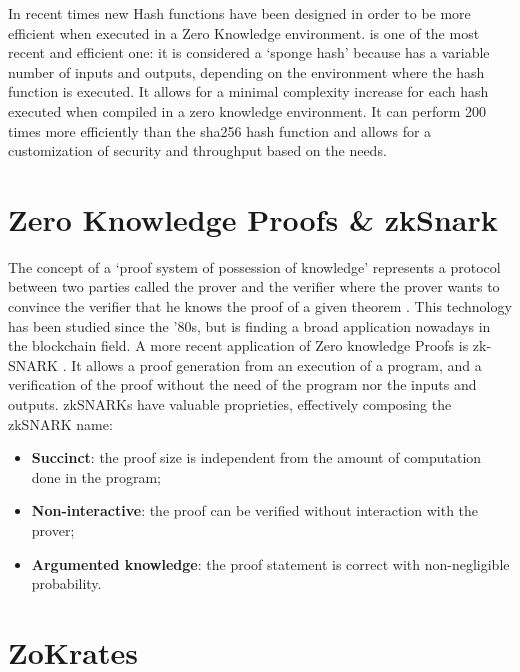 In recent times new Hash functions have been designed in order to be more efficient when executed in a Zero Knowledge environment. \cite{grassi_poseidon_2021} is one of the most recent and efficient one: it is considered a `sponge hash' because has a variable number of inputs and outputs, depending on the environment where the hash function is executed. It allows for a minimal complexity increase for each hash executed when compiled in a zero knowledge environment. It can perform 200 times more efficiently than the sha256 hash function and allows for a customization of security and throughput based on the needs.

\section{Zero Knowledge Proofs \& zkSnark}

The concept of a `proof system of possession of knowledge' represents a protocol between two parties called the prover and the verifier where the prover wants to convince the verifier that he knows the proof of a given theorem \cite{de_santis_zero-knowledge_1992}. This technology has been studied since the '80s, but is finding a broad application nowadays in the blockchain field. A more recent application of Zero knowledge Proofs is zk-SNARK \cite{bitansky_extractable_2012}. It allows a proof generation from an execution of a program, and a verification of the proof without the need of the program nor the inputs and outputs. zkSNARKs have valuable proprieties, effectively composing the zkSNARK name:
\begin{itemize}
      \item \textbf{Succinct}: the proof size is independent from the amount of computation done in the program;
            \vspace{-0.11in}
      \item \textbf{Non-interactive}: the proof can be verified without interaction with the prover;
            \vspace{-0.11in}
      \item \textbf{Argumented knowledge}: the proof statement is correct with non-negligible probability.
            \vspace{-0.11in}
\end{itemize}

\section{ZoKrates}

